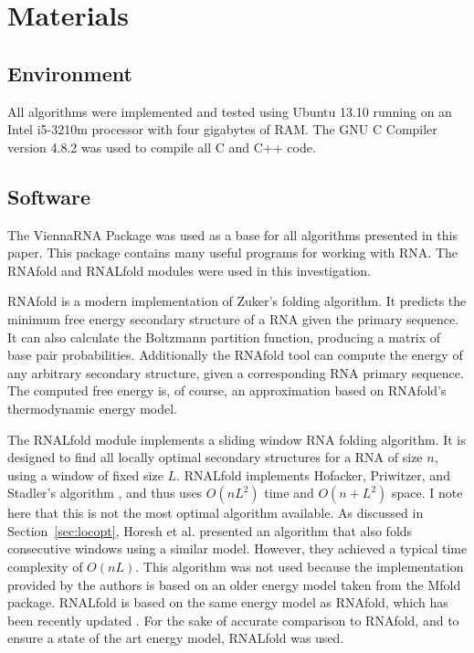 \documentclass{cshonours}
\begin{document}
\section{Materials}
\subsection{Environment}
All algorithms were implemented and tested using Ubuntu 13.10 running on an Intel i5-3210m processor with four gigabytes of RAM. The GNU C Compiler version 4.8.2 was used to compile all C and C++ code. 

\subsection{Software}
The ViennaRNA Package \cite{lorenz2011viennarna} was used as a base for all algorithms presented in this paper. This package contains many useful programs for working with RNA. The RNAfold and RNALfold modules were used in this investigation. 

RNAfold is a modern implementation of Zuker's folding algorithm. It predicts the minimum free energy secondary structure of a RNA given the primary sequence. It can also calculate the Boltzmann partition function, producing a matrix of base pair probabilities. Additionally the RNAfold tool can compute the energy of any arbitrary secondary structure, given a corresponding RNA primary sequence. The computed free energy is, of course, an approximation based on RNAfold's thermodynamic energy model.

The RNALfold module implements a sliding window RNA folding algorithm. It is designed to find all locally optimal secondary structures for a RNA of size $n$, using a window of fixed size $L$. RNALfold implements Hofacker, Priwitzer, and Stadler's algorithm \cite{hofacker2004prediction}, and thus uses $O(nL^2)$ time and $O(n + L^2)$ space. I note here that this is not the most optimal algorithm available. As discussed in Section~\ref{sec:locopt}, Horesh et al. \cite{horesh2009rnaslider} presented an algorithm that also folds consecutive windows using a similar model. However, they achieved a typical time complexity of $O(nL)$. This algorithm was not used because the implementation provided by the authors is based on an older energy model taken from the Mfold \cite{zuker2003mfold} package. RNALfold is based on the same energy model as RNAfold, which has been recently updated \cite{lorenz2011viennarna}. For the sake of accurate comparison to RNAfold, and to ensure a state of the art energy model, RNALfold was used.
\end{document}

